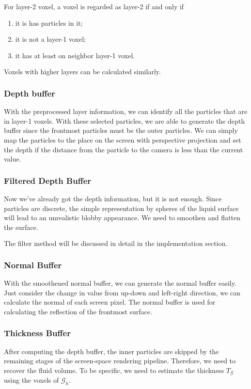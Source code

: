 \documentclass[sigconf]{acmart}
\begin{document}
For layer-2 voxel, a voxel is regarded as layer-2 if and only if
\begin{enumerate}
\item it is has particles in it;
\item it is not a layer-1 voxel;
\item it has at least on neighbor layer-1 voxel.
\end{enumerate}

Voxels with higher layers can be calculated similarly.

\subsubsection{Depth buffer}
With the preprocessed layer information, we can identify all the particles that are in layer-1 voxels. With these selected particles, we are able to generate the depth buffer since the frontmost particles must be the outer particles. We can simply map the particles to the place on the screen with perspective projection and set the depth if the distance from the particle to the camera is less than the current value.

\subsubsection{Filtered Depth Buffer}
Now we've already got the depth information, but it is not enough. Since particles are discrete, the simple representation by spheres of the liquid surface will lead to an unrealistic blobby appearance. We need to smoothen and flatten the surface.

The filter method will be discussed in detail in the implementation section.

\subsubsection{Normal Buffer}
With the smoothened normal buffer, we can generate the normal buffer easily. Just consider the change in value from up-down and left-right direction, we can calculate the normal of each screen pixel. The normal buffer is used for calculating the reflection of the frontmost surface.

\subsubsection{Thickness Buffer}
After computing the depth buffer, the inner particles are skipped by the remaining stages of the screen-space rendering pipeline. Therefore, we need to recover the fluid volume. To be specific, we need to estimate the thickness $T_{\mathcal{G}}$ using the voxels of $\mathcal{G}_h$.
\end{document}
